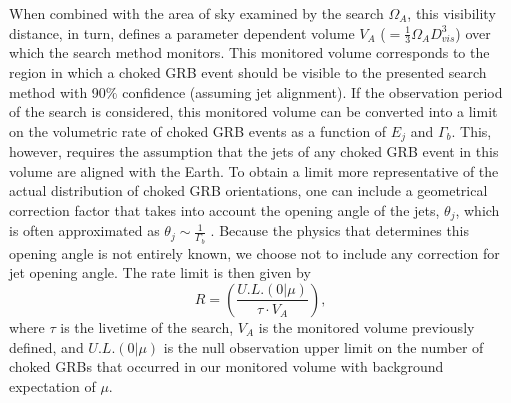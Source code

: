 \documentclass[manuscript]{aastex}
\begin{document}
When combined with the area of sky examined by the search $\Omega_{A}$, this visibility distance, in turn, defines a parameter dependent volume $V_A$ ($=\frac{1}{3}\Omega_{A}D_{vis}^{3}$) over which the search method monitors. This monitored volume corresponds to the region in which a choked GRB event should be visible to the presented search method with 90$\%$ confidence (assuming jet alignment). If the observation period of the search is considered, this monitored volume can be converted into a limit on the volumetric rate of choked GRB events as a function of $E_j$ and $\Gamma_b$. This, however, requires the assumption that the jets of any choked GRB event in this volume are aligned with the Earth. To obtain a limit more representative of the actual distribution of choked GRB orientations, one can include a geometrical correction factor that takes into account the opening angle of the jets, $\theta_j$, which is often approximated as $\theta_j \sim \frac{1}{\Gamma_b}$ \citep{2013ApJ...777..162M}. Because the physics that determines this opening angle is not entirely known, we choose not to include any correction for jet opening angle. The rate limit is then given by
\begin{equation}\label{eq:ratelimit}
R = \left(\frac{U.L.(0|\mu)}{\tau \cdot V_A}\right),
\end{equation}
where $\tau$ is the livetime of the search, $V_A$ is the monitored volume previously defined, and $U.L.(0|\mu)$ is the null observation upper limit on the number of choked GRBs that occurred in our monitored volume with background expectation of $\mu$.
\end{document}
